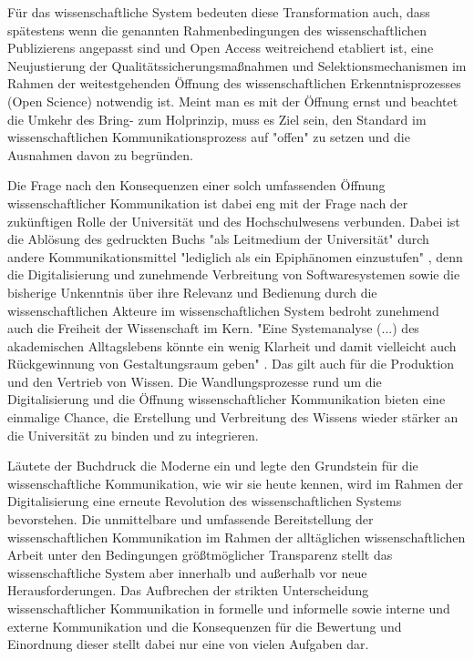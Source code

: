 Für das wissenschaftliche System bedeuten diese Transformation auch, dass spätestens wenn die genannten Rahmenbedingungen des wissenschaftlichen Publizierens angepasst sind und Open Access weitreichend etabliert ist, eine Neujustierung der Qualitätssicherungsmaßnahmen und Selektionsmechanismen im Rahmen der weitestgehenden Öffnung des wissenschaftlichen Erkenntnisprozesses (Open Science) notwendig ist. Meint man es mit der Öffnung ernst und beachtet die Umkehr des Bring- zum Holprinzip, muss es Ziel sein, den Standard im wissenschaftlichen Kommunikationsprozess auf "offen" zu setzen und die Ausnahmen davon zu begründen.

Die Frage nach den Konsequenzen einer solch umfassenden Öffnung wissenschaftlicher Kommunikation ist dabei eng mit der Frage nach der zukünftigen Rolle der Universität und des Hochschulwesens verbunden. Dabei ist die Ablösung des gedruckten Buchs "als Leitmedium der Universität" durch andere Kommunikationsmittel "lediglich als ein Epiphänomen einzustufen" \cite{Warnke_2012}, denn die Digitalisierung und zunehmende Verbreitung von Softwaresystemen sowie die bisherige Unkenntnis über ihre Relevanz und Bedienung durch die wissenschaftlichen Akteure im wissenschaftlichen System bedroht zunehmend auch die Freiheit der Wissenschaft im Kern. "Eine Systemanalyse (...) des akademischen Alltagslebens könnte ein wenig Klarheit und damit vielleicht auch Rückgewinnung von Gestaltungsraum geben" \cite{Warnke_2012}. Das gilt auch für die Produktion und den Vertrieb von Wissen. Die Wandlungsprozesse rund um die Digitalisierung und die Öffnung wissenschaftlicher Kommunikation bieten eine einmalige Chance, die Erstellung und Verbreitung des Wissens wieder stärker an die Universität zu binden und zu integrieren.

Läutete der Buchdruck die Moderne ein und legte den Grundstein für die wissenschaftliche Kommunikation, wie wir sie heute kennen, wird im Rahmen der Digitalisierung eine erneute Revolution des wissenschaftlichen Systems bevorstehen. Die unmittelbare und umfassende Bereitstellung der wissenschaftlichen Kommunikation im Rahmen der alltäglichen wissenschaftlichen Arbeit unter den Bedingungen größtmöglicher Transparenz stellt das wissenschaftliche System aber innerhalb und außerhalb vor neue Herausforderungen. Das Aufbrechen der strikten Unterscheidung wissenschaftlicher Kommunikation in formelle und informelle sowie interne und externe Kommunikation und die Konsequenzen für die Bewertung und Einordnung dieser stellt dabei nur eine von vielen Aufgaben dar.

